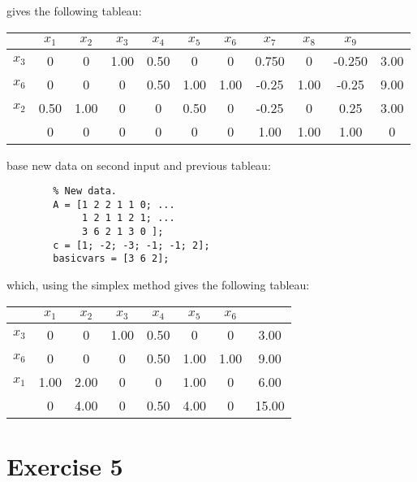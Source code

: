\documentclass{article}
\begin{document}
    gives the following tableau:

        \begin{center}
            \begin{tabular}{ | c | c c c c c c c c c | c | }
                \hline
                       & $x_1$ & $x_2$ & $x_3$ & $x_4$ & $x_5$ & $x_6$ & $x_7$ & $x_8$ & $x_9$ &\\
                \hline
                  $x_3$ & 0& 0& 1.00& 0.50& 0& 0& 0.750& 0& -0.250& 3.00\\
                  $x_6$ & 0& 0& 0& 0.50& 1.00& 1.00& -0.25& 1.00& -0.25 & 9.00\\
                  $x_2$ & 0.50& 1.00& 0& 0& 0.50& 0& -0.25 & 0& 0.25 & 3.00\\
                \hline
                       & 0& 0& 0& 0& 0& 0& 1.00& 1.00& 1.00& 0 \\
                \hline
            \end{tabular}
        \end{center}

    base new data on second input and previous tableau:

    \begin{lstlisting}
        % New data.
        A = [1 2 2 1 1 0; ...
             1 2 1 1 2 1; ...
             3 6 2 1 3 0 ];
        c = [1; -2; -3; -1; -1; 2];
        basicvars = [3 6 2];
    \end{lstlisting}

    which, using the simplex method gives the following tableau:

    \begin{center}
        \begin{tabular}{ | c | c c c c c c | c | }
            \hline
                          & $x_1$ & $x_2$ & $x_3$ & $x_4$ & $x_5$ & $x_6$ &\\
            \hline
                   $x_3$  & 0& 0& 1.00& 0.50& 0& 0& 3.00 \\
                   $x_6$  & 0& 0& 0& 0.50& 1.00& 1.00& 9.00 \\
                   $x_1$  & 1.00& 2.00& 0& 0& 1.00& 0& 6.00 \\
            \hline
                          & 0& 4.00& 0& 0.50& 4.00& 0& 15.00 \\
            \hline
        \end{tabular}
    \end{center}

\section*{Exercise 5}
\end{document}
